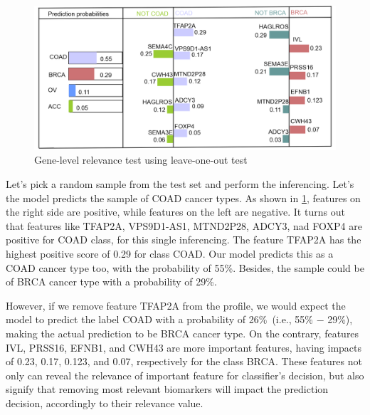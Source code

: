 \begin{figure}[h]
    \vspace{-2mm}
	\centering
	\includegraphics[scale=0.6]{images/reli_explain.png}
	\caption{Gene-level relevance test using leave-one-out test}
    \label{fig:explain_term_wise_religious_hate}
	\vspace{-4mm}
\end{figure}

\hspace*{3.5mm} Let's pick a random sample from the test set and perform the inferencing. Let's the model predicts the sample of COAD cancer types. As shown in \cref{fig:explain_term_wise_religious_hate}, features on the right side are positive, while features on the left are negative. It turns out that features like TFAP2A,  VPS9D1-AS1, MTND2P28, ADCY3, nad FOXP4 are positive for COAD class, for this single inferencing. The feature TFAP2A has the highest positive score of 0.29 for class COAD. Our model predicts this as a COAD cancer type too, with the probability of 55\%. Besides, the sample could be of BRCA cancer type with a probability of 29\%.  

\hspace*{3.5mm} However, if we remove feature TFAP2A from the profile, we would expect the model to predict the label COAD with a probability of 26\%~(i.e., 55\% $-$ 29\%), making the actual prediction to be BRCA cancer type. On the contrary, features IVL, PRSS16, EFNB1, and CWH43 are more important features, having impacts of 0.23, 0.17, 0.123, and 0.07, respectively for the class BRCA. These features not only can reveal the relevance of important feature for classifier’s decision, but also signify that removing most relevant biomarkers will impact the prediction decision, accordingly to their relevance value. 


